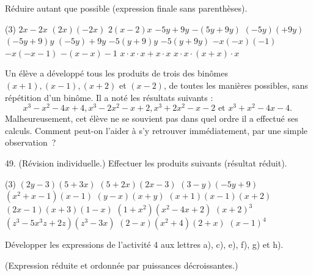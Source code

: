\documentclass[a4paper,12pt]{report}
\begin{document}
\begin{comment}
\begin{exo}
(*) Si $10 a+b$ est un multiple de $7, a-2 b$ est-il multiple de 7~?
\end{exo}
\end{comment}
\begin{exo}
Réduire autant que possible (expression finale sans parenthèses).
\begin{tasks}(3)
\task $2 x-2 x$
\task $(2 x)(-2 x)$
\task $2(x-2) x$
\task $-5 y+9 y$
\task $-(5 y+9 y)$
\task $(-5 y)(+9 y)$
\task $(-5 y+9) y$
\task $(-5 y)+9 y$
\task $-5(y+9) y$
\task $-5(y+9 y)$
\task $-x(-x)(-1)$
\task $-x(-x-1)$
\task $-(x-x)-1$
\task $x \cdot x \cdot x+x \cdot x$
\task $x \cdot x \cdot(x+x) \cdot x$
\end{tasks}
\end{exo}
\begin{exo}
Un élève a développé tous les produits de trois des binômes $(x+1),(x-1),(x+2)$ et $(x-2)$, de toutes les manières possibles, sans répétition d'un binôme. Il a noté les résultats suivants :
$$
x^3-x^2-4 x+4, x^3-2 x^2-x+2, x^3+2 x^2-x-2 \text { et } x^3+x^2-4 x-4 \text {. }
$$
Malheureusement, cet élève ne se souvient pas dans quel ordre il a effectué ses calculs.
Comment peut-on l'aider à s'y retrouver immédiatement, par une simple observation~?
\end{exo}
\begin{exo}
49. (Révision individuelle.) Effectuer les produits suivants (résultat réduit).
\begin{tasks}(3)
\task $(2 y-3)(5+3 x)$
\task $(5+2 x)(2 x-3)$
\task $(3-y)(-5 y+9)$
\task $\left(x^2+x-1\right)(x-1)$
\task $(y-x)(x+y)$
\task $(x+1)(x-1)(x+2)$
\task $(2 x-1)(x+3)(1-x)$
\task $\left(1+x^2\right)\left(x^2-4 x+2\right)$
\task $(x+2)^3$
\task $\left(z^3-5 x^3 z+2 z\right)\left(z^3-3 x\right)$
\task $(2-x)\left(x^2+4\right)(2+x)$
\task $(x-1)^4$
\end{tasks}
\end{exo}

\begin{exo}
	Développer les expressions de l'activité 4 aux lettres a), c), e), f), g) et h). 

(Expression réduite et ordonnée par puissances décroissantes.)
\end{exo}
\end{document}
